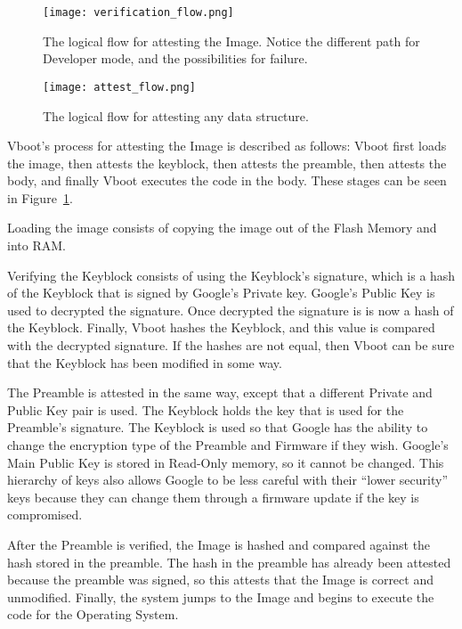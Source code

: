 \begin{figure}
  \centering
  \texttt{[image: verification\_flow.png]}
  \caption[Verified Boot Program Flow]{The logical flow for attesting the Image. Notice
  the different path for Developer mode, and the possibilities for
  failure.}\label{fig:verif_flow}
\end{figure}
\begin{figure}
  \centering
  \texttt{[image: attest\_flow.png]}
  \caption[General Attest Flow]{The logical flow for attesting any data
      structure.}\label{fig:attest_flow}
\end{figure}

Vboot's process for attesting the Image is described as follows: Vboot first
loads the image, then attests the keyblock, then attests the
preamble, then attests the body, and finally Vboot executes the code in the body. 
These stages can be seen in Figure~\ref{fig:verif_flow}.

Loading the image consists of copying the image out of the Flash Memory and into
RAM\@.

Verifying the Keyblock consists of using the Keyblock's signature, which is a
hash of the Keyblock that is signed by Google's Private key.
Google's Public Key is used to decrypted the signature.
Once decrypted the signature is is now a hash of the Keyblock.
Finally, Vboot hashes the Keyblock, and this value is compared with the
decrypted signature.
If the hashes are not equal, then Vboot can be sure that the Keyblock has been
modified in some way. 

The Preamble is attested in the same way, except that a different Private and Public Key pair is used.
The Keyblock holds the key that is used for the Preamble's signature.
The Keyblock is used so that Google has the ability to change the encryption
type of the Preamble and Firmware if they wish.
Google's Main Public Key is stored in Read-Only memory, so it cannot be changed.
This hierarchy of keys also allows Google to be less careful with their ``lower
security'' keys because they can change them through a firmware update if the key is
compromised.

After the Preamble is verified, the Image is hashed and compared
against the hash stored in the preamble. 
The hash in the preamble has already been attested because the preamble was
signed, so this attests that the Image is correct and unmodified. Finally, the
system jumps to the Image and begins to execute the code for the 
Operating System.


